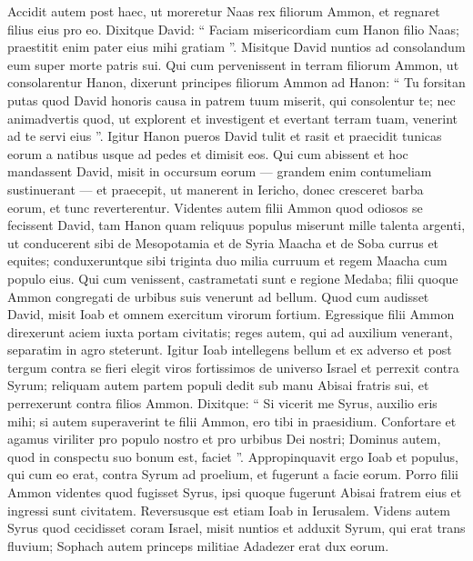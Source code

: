 \begin{biblechapter}
\begin{biblechapter}
\begin{biblechapter}
\begin{biblechapter}
\begin{biblechapter}
\begin{biblechapter}
\begin{biblechapter}
\begin{biblechapter}
\begin{biblechapter}
\begin{biblechapter}
\begin{biblechapter}
\begin{biblechapter}
\begin{biblechapter}
\begin{biblechapter}
\begin{biblechapter}
\begin{biblechapter}
\begin{biblechapter}
\begin{biblechapter}
\begin{biblechapter}
\verse Accidit autem post haec, ut moreretur Naas rex filiorum Ammon, et regnaret filius eius pro eo. 
\verse Dixitque David: “ Faciam misericordiam cum Hanon filio Naas; praestitit enim pater eius mihi gratiam ”. Misitque David nuntios ad consolandum eum super morte patris sui. Qui cum pervenissent in terram filiorum Ammon, ut consolarentur Hanon, 
\verse dixerunt principes filiorum Ammon ad Hanon: “ Tu forsitan putas quod David honoris causa in patrem tuum miserit, qui consolentur te; nec animadvertis quod, ut explorent et investigent et evertant terram tuam, venerint ad te servi eius ”. 
\verse Igitur Hanon pueros David tulit et rasit et praecidit tunicas eorum a natibus usque ad pedes et dimisit eos. 
\verse Qui cum abissent et hoc mandassent David, misit in occursum eorum — grandem enim contumeliam sustinuerant — et praecepit, ut manerent in Iericho, donec cresceret barba eorum, et tunc reverterentur.
 \verse Videntes autem filii Ammon quod odiosos se fecissent David, tam Hanon quam reliquus populus miserunt mille talenta argenti, ut conducerent sibi de Mesopotamia et de Syria Maacha et de Soba currus et equites; 
\verse conduxeruntque sibi triginta duo milia curruum et regem Maacha cum populo eius. Qui cum venissent, castrametati sunt e regione Medaba; filii quoque Ammon congregati de urbibus suis venerunt ad bellum.
 \verse Quod cum audisset David, misit Ioab et omnem exercitum virorum fortium. 
\verse Egressique filii Ammon direxerunt aciem iuxta portam civitatis; reges autem, qui ad auxilium venerant, separatim in agro steterunt. 
\verse Igitur Ioab intellegens bellum et ex adverso et post tergum contra se fieri elegit viros fortissimos de universo Israel et perrexit contra Syrum; 
\verse reliquam autem partem populi dedit sub manu Abisai fratris sui, et perrexerunt contra filios Ammon. 
\verse Dixitque: “ Si vicerit me Syrus, auxilio eris mihi; si autem superaverint te filii Ammon, ero tibi in praesidium. 
\verse Confortare et agamus viriliter pro populo nostro et pro urbibus Dei nostri; Dominus autem, quod in conspectu suo bonum est, faciet ”. 
\verse Appropinquavit ergo Ioab et populus, qui cum eo erat, contra Syrum ad proelium, et fugerunt a facie eorum. 
\verse Porro filii Ammon videntes quod fugisset Syrus, ipsi quoque fugerunt Abisai fratrem eius et ingressi sunt civitatem. Reversusque est etiam Ioab in Ierusalem.
 \verse Videns autem Syrus quod cecidisset coram Israel, misit nuntios et adduxit Syrum, qui erat trans fluvium; Sophach autem princeps militiae Adadezer erat dux eorum. 

\end{biblechapter}
\end{biblechapter}
\end{biblechapter}
\end{biblechapter}
\end{biblechapter}
\end{biblechapter}
\end{biblechapter}
\end{biblechapter}
\end{biblechapter}
\end{biblechapter}
\end{biblechapter}
\end{biblechapter}
\end{biblechapter}
\end{biblechapter}
\end{biblechapter}
\end{biblechapter}
\end{biblechapter}
\end{biblechapter}
\end{biblechapter}
